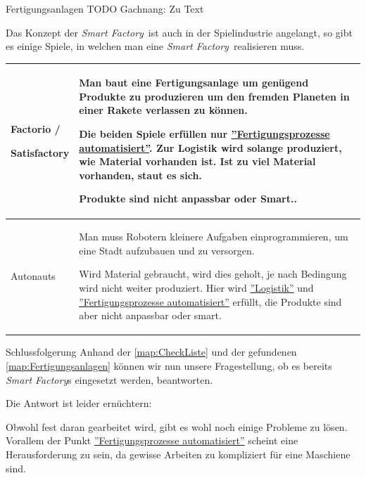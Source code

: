 \documentclass{article}
\def\SmartFactory{\textcolor{DarkestGray}{\textit{Smart Factory}}}
\begin{document}
\begin{Map}{Fertigungsanlagen}
TODO Gachnang: Zu Text\par
Das Konzept der \SmartFactory\ ist auch in der Spielindustrie angelangt, so gibt es einige Spiele, in welchen man eine \SmartFactory\ realisieren muss.
\par\medskip
\begin{tabular}{p{3.2cm}p{8cm}}\toprule
  Factorio / \par Satisfactory & Man baut eine Fertigungsanlage um genügend Produkte zu produzieren um den fremden Planeten in einer Rakete verlassen zu können. \par Die beiden Spiele erfüllen nur \hyperlink{CheckListe:Fertigungsprozess}{''Fertigungsprozesse automatisiert''}. Zur Logistik wird solange produziert, wie Material vorhanden ist. Ist zu viel Material vorhanden, staut es sich.\par Produkte sind nicht anpassbar oder Smart.. \\\midrule
  Autonauts & Man muss Robotern kleinere Aufgaben einprogrammieren, um eine Stadt aufzubauen und zu versorgen. \par Wird Material gebraucht, wird dies geholt, je nach Bedingung wird nicht weiter produziert. Hier wird \hyperlink{CheckListe:Logistik}{''Logistik''} und \hyperlink{CheckListe:Fertigungsprozess}{''Fertigungsprozesse automatisiert''} erfüllt, die Produkte sind aber nicht anpassbar oder smart. \\\bottomrule
\end{tabular}
\end{Map}

\begin{Map}{Schlussfolgerung}
Anhand der \ref{map:CheckListe} und der gefundenen \ref{map:Fertigungsanlagen} können wir nun unsere Fragestellung, ob es bereits \SmartFactory s eingesetzt werden, beantworten. \par

Die Antwort ist leider ernüchtern:\par
Obwohl fest daran gearbeitet wird, gibt es wohl noch einige Probleme zu lösen. Vorallem der Punkt \hyperlink{CheckListe:Fertigungsprozess}{''Fertigungsprozesse automatisiert''} scheint eine Herausforderung zu sein, da gewisse Arbeiten zu kompliziert für eine Maschiene sind.

\end{Map}
\end{document}
